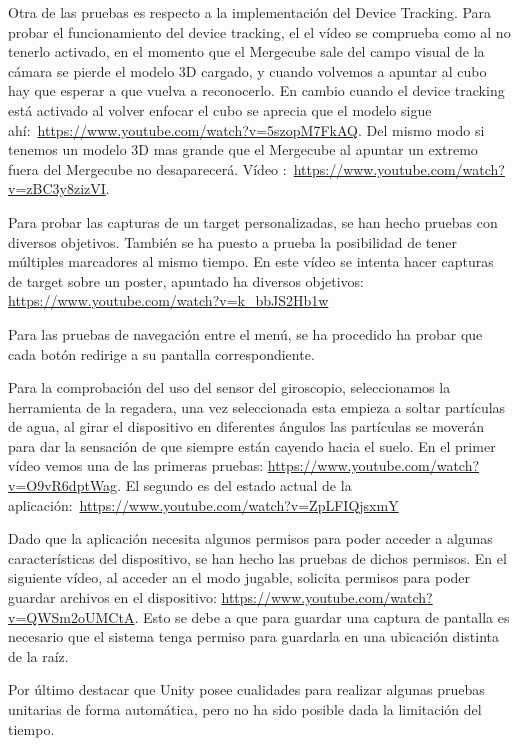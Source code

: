 Otra de las pruebas es respecto a la implementación del Device Tracking. Para probar el funcionamiento del device tracking, el el vídeo se comprueba como al no tenerlo activado, en el momento que el Mergecube sale del campo visual de la cámara se pierde el modelo 3D cargado, y cuando volvemos a apuntar al cubo hay que esperar a que vuelva a reconocerlo. En cambio cuando el device tracking está activado al volver enfocar el cubo se aprecia que el modelo sigue ahí:~\url{https://www.youtube.com/watch?v=5szopM7FkAQ}. Del mismo modo si tenemos un modelo 3D mas grande que el Mergecube al apuntar un extremo fuera del Mergecube no desaparecerá. Vídeo :~\url{https://www.youtube.com/watch?v=zBC3y8zizVI}.


Para probar las capturas de un target personalizadas, se han hecho pruebas con diversos objetivos. También se ha puesto a prueba la posibilidad de tener múltiples marcadores al mismo tiempo. En este vídeo se intenta hacer capturas de target sobre un poster, apuntado ha diversos objetivos: \url{https://www.youtube.com/watch?v=k_bbJS2Hb1w}	

Para las pruebas de navegación entre el menú, se ha procedido ha probar que cada botón redirige a su pantalla correspondiente.

Para la comprobación del uso del sensor del giroscopio, seleccionamos la herramienta de la regadera, una vez seleccionada esta empieza a soltar partículas de agua, al girar el dispositivo en diferentes ángulos las partículas se moverán para dar la sensación de que siempre están cayendo hacia el suelo. En el primer vídeo vemos una de las primeras pruebas: \url{https://www.youtube.com/watch?v=O9vR6dptWag}. El segundo es del estado actual de la aplicación:~\url{https://www.youtube.com/watch?v=ZpLFIQjsxmY}


Dado que la aplicación necesita algunos permisos para poder acceder a algunas características del dispositivo, se han hecho las pruebas de dichos permisos. En el siguiente vídeo, al acceder an el modo jugable, solicita permisos para poder guardar archivos en el dispositivo: \url{https://www.youtube.com/watch?v=QWSm2oUMCtA}. Esto se debe a que para guardar una captura de pantalla es necesario que el sistema tenga permiso para guardarla en una ubicación distinta de la raíz.




Por último destacar que Unity posee cualidades para realizar algunas pruebas unitarias de forma automática, pero no ha sido posible dada la limitación del tiempo.